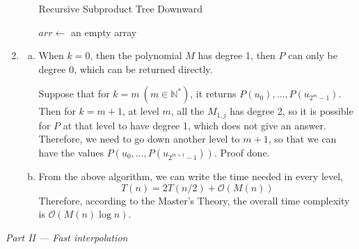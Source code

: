 \documentclass[12pt, a4paper]{article}
\begin{document}
\begin{enumerate}
\begin{enumerate}[a)]
              \begin{algorithm}[!htb]
                  \caption{Recursive Subproduct Tree Downward}
                  \BlankLine
                  $arr \leftarrow$ an empty array\;
                  \;
                  \;
              \end{algorithm}
    \end{enumerate}
    \item \begin{enumerate}[a)]
        \item When $k = 0$, then the polynomial $M$ has degree 1, then $P$ can only be degree 0, which can be returned directly.
          
            Suppose that for $k = m\ (m \in \mathbb{N}^*)$, it returns $P(u_0), \dots, P(u_{2^m - 1})$. Then for $k = m + 1$, 
            at level $m$, all the $M_{1, j}$ has degree 2, so it is possible for $P$ at that level to have degree 1, 
            which does not give an answer. Therefore, we need to go down another level to $m+1$, 
            so that we can have the values $P(u_0, \dots, P(u_{2^{m+1} - 1}))$. Proof done.
        \item From the above algorithm, we can write the time needed in every level,
              \[T(n) = 2T(n/2) + \mathcal{O}(M(n))\]
              Therefore, according to the Master's Theory, the overall time complexity is $\mathcal{O}(M(n)\log n)$.
    \end{enumerate} 
\end{enumerate}

\newpage
\begin{center}
    \textit{Part II --- Fast interpolation}
\end{center}
\end{document}
